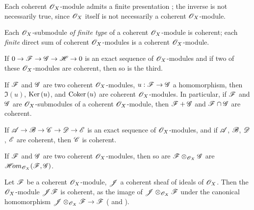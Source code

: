 \begin{env}[5.3.2]
\label{0.5.3.2}
Each coherent $\mathscr{O}_X$-module admits a finite presentation ;
the inverse is not necessarily true, since $\mathscr{O}_X$ itself is not necessarily a coherent $\mathscr{O}_X$-module.

Each $\mathscr{O}_X$-submodule \emph{of finite type} of a coherent $\mathscr{O}_X$-module is coherent;
each \emph{finite} direct sum of coherent $\mathscr{O}_X$-modules is a coherent $\mathscr{O}_X$-module.
\end{env}

\begin{env}[5.3.3]
\label{0.5.3.3}
If $0\to\sh{F}\to\sh{G}\to\sh{H}\to 0$ is an exact sequence of $\mathscr{O}_X$-modules and if two of these $\mathscr{O}_X$-modules are coherent, then so is the third.
\end{env}

\begin{env}[5.3.4]
\label{0.5.3.4}
If $\mathscr{F}$ and $\mathscr{G}$ are two coherent $\mathscr{O}_X$-modules, $u:\sh{F}\to\sh{G}$ a homomorphism, then $\Im(u)$, ${\mathop{\mathrm{Ker}}\nolimits}\,(u)$, and ${\mathop{\mathrm{Coker}}\nolimits}\,(u)$ are coherent $\mathscr{O}_X$-modules.
In particular, if $\mathscr{F}$ and $\mathscr{G}$ are $\mathscr{O}_X$-submodules of a coherent $\mathscr{O}_X$-module, then $\mathscr{F}+\mathscr{G}$ and $\mathscr{F}\cap\mathscr{G}$ are coherent.

If $\sh{A}\to\sh{B}\to\sh{C}\to\sh{D}\to\sh{E}$ is an exact sequence of $\mathscr{O}_X$-modules, and if $\mathscr{A}$, $\mathscr{B}$, $\mathscr{D}$, $\mathscr{E}$ are coherent, then $\mathscr{C}$ is coherent.
\end{env}

\begin{env}[5.3.5]
\label{0.5.3.5}
If $\mathscr{F}$ and $\mathscr{G}$ are two coherent $\mathscr{O}_X$-modules, then so are $\mathscr{F}\otimes_{\mathscr{O}_X}\mathscr{G}$ are $\mathscr{H}\!{om}_{\mathscr{O}_X}(\mathscr{F},\mathscr{G})$.
\end{env}

\begin{env}[5.3.6]
\label{0.5.3.6}
Let $\mathscr{F}$ be a coherent $\mathscr{O}_X$-module, $\mathscr{J}$ a coherent sheaf of ideals of $\mathscr{O}_X$.
Then the $\mathscr{O}_X$-module $\mathscr{J}\mathscr{F}$ is coherent, as the image of $\mathscr{J}\otimes_{\mathscr{O}_X}\mathscr{F}$ under the canonical homomorphism $\sh{J}\otimes_{\sh{O}_X}\sh{F}\to\sh{F}$ ( and ).
\end{env}


